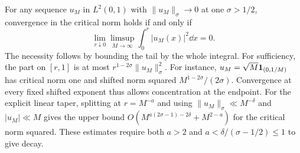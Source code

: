 For any sequence \(u_M\) in \(L^2(0,1)\) with \(\|u_M\|_\sigma\to0\) at one \(\sigma>1/2\), convergence in the critical norm holds if and only if
\[
 \lim_{r\downarrow0}\limsup_{M\to\infty}\int_0^r|u_M(x)|^2\dd x=0.
\]
The necessity follows by bounding the tail by the whole integral. For sufficiency, the part on \([r,1]\) is at most \(r^{1-2\sigma}\|u_M\|_\sigma^2\). For instance, \(u_M=\sqrt M\mathbf 1_{(0,1/M)}\) has critical norm one and shifted norm squared \(M^{1-2\sigma}/(2\sigma)\). Convergence at every fixed shifted exponent thus allows concentration at the endpoint. For the explicit linear taper, splitting at \(r=M^{-a}\) and using \(\|u_M\|_\sigma\ll M^{-\delta}\) and \(|u_M|\ll M\) gives the upper bound \(O(M^{a(2\sigma-1)-2\delta}+M^{2-a})\) for the critical norm squared. These estimates require both \(a>2\) and \(a<\delta/(\sigma-1/2)\le1\) to give decay.

